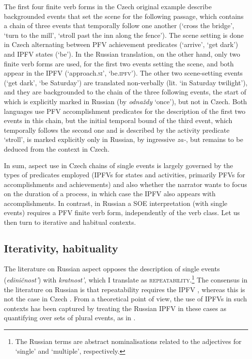 \documentclass[output=paper,colorlinks,citecolor=brown]{langscibook}
\begin{document}
\noindent The first four finite verb forms in the Czech original example describe backgrounded events that set the scene for the following passage, which contains a chain of three events that temporally follow one another (`cross the bridge', `turn to the mill', `stroll past the inn along the fence'). The scene setting is done in Czech alternating between PFV achievement predicates (`arrive', `get dark') and IPFV states (`be'). In the Russian translation, on the other hand, only two finite verb forms are used, for the first two events setting the scene, and both appear in the IPFV (`approach.\textsc{si}', `be.\textsc{ipfv}'). The other two scene-setting events (`get dark', `be Saturday') are translated non-verbally (lit. `in Saturday twilight'), and they are backgrounded to the chain of the three following events, the start of which is explicitly marked in Russian (by \textit{{odnaždy}} `once'), but not in Czech. Both languages use PFV accomplishment predicates for the description of the first two events in this chain, but the initial temporal bound of the third event, which temporally follows the second one and is described by the activity predicate `stroll', is marked explicitly only in Russian, by ingressive \textit{za-}, but remains to be deduced from the context in Czech.   

In sum, aspect use in Czech chains of single events is largely governed by the types of predicates employed (IPFVs for states and activities, primarily PFVs for accomplishments and achievements) and also whether the narrator wants to focus on the duration of a process, in which case the IPFV also appears with accomplishments. In contrast, in Russian a SOE interpretation (with single events) requires a PFV finite verb form, independently of the verb class. Let us then turn to iterative and habitual contexts.

\subsection{Iterativity, habituality}
\label{sec:hab}

The literature on Russian aspect opposes the description of single events (\textit{edi\-nič\-nost'}) with \textit{kratnost'}, which I translate as \textsc{repeatability}.\footnote{The Russian terms are abstract nominalisations related to the adjectives for `single' and `multiple', respectively.} The consensus in the literature on Russian is that repeatability requires the IPFV \citep[e.g.][]{paduceva96,zaliznjaksmelev97}, whereas this is not the case in Czech \citep[e.g.][]{%
eckert84,%
stunova93,Dickey2000,kresin00,gehrke02,gehrke22,duebbersdiss,fortuin2015typology}. From a theoretical point of view, the use of IPFVs in such contexts has been captured by treating the Russian IPFV in these cases as quantifying over sets of plural events, as in \citet{kagandiss,Altshuler2012,altshuler14} \citep[the latter following][]{ferreira2005}.
\end{document}
